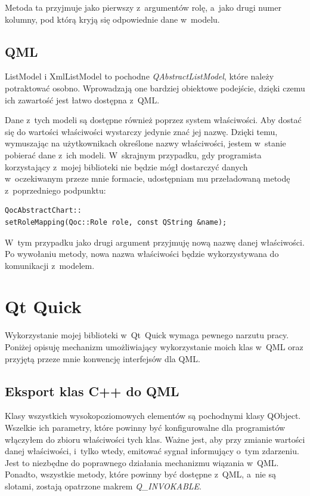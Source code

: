 Metoda ta przyjmuje jako pierwszy z~argumentów rolę, a~jako drugi numer kolumny, pod którą kryją się odpowiednie dane w~modelu.


\subsection{QML}
ListModel i XmlListModel to pochodne \textit{QAbstractListModel}, które należy potraktować osobno. Wprowadzają one bardziej obiektowe podejście, dzięki czemu ich zawartość jest łatwo dostępna z~QML.

Dane z~tych modeli są dostępne również poprzez system właściwości. Aby dostać się do wartości właściwości wystarczy jedynie znać jej nazwę. Dzięki temu, wymuszając na użytkownikach określone nazwy właściwości, jestem w~stanie pobierać dane z~ich modeli. W~skrajnym przypadku, gdy programista korzystający z~mojej biblioteki nie będzie mógł dostarczyć danych w~oczekiwanym przeze mnie formacie, udostępniam mu przeładowaną metodę z~poprzedniego podpunktu:

\begin{lstlisting}
QocAbstractChart::
setRoleMapping(Qoc::Role role, const QString &name);
\end{lstlisting}

W~tym przypadku jako drugi argument przyjmuję nową nazwę danej właściwości. Po wywołaniu metody, nowa nazwa właściwości będzie wykorzystywana do komunikacji z~modelem.


\section{Qt Quick}
Wykorzystanie mojej biblioteki w~Qt~Quick wymaga pewnego narzutu pracy. Poniżej opisuję mechanizm umożliwiający wykorzystanie moich klas w~QML oraz przyjętą przeze mnie konwencję interfejsów dla QML.

\subsection{Eksport klas C++ do QML}
Klasy wszystkich wysokopoziomowych elementów są pochodnymi klasy QObject. Wszelkie ich parametry, które powinny być konfigurowalne dla programistów włączyłem do zbioru właściwości tych klas. Ważne jest, aby przy zmianie wartości danej właściwości, i~tylko wtedy, emitować sygnał informujący o~tym zdarzeniu. Jest to niezbędne do poprawnego działania mechanizmu wiązania w~QML. Ponadto, wszystkie metody, które powinny być dostępne z~QML, a~nie są slotami, zostają opatrzone makrem \textit{Q\_INVOKABLE}.


